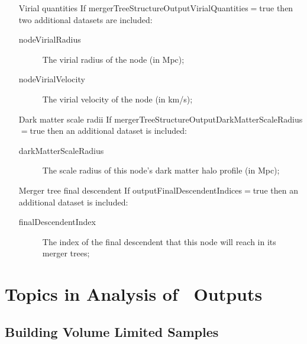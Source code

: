 \begin{itemize}
 \item [Virial quantities] If {\normalfont \ttfamily mergerTreeStructureOutputVirialQuantities}$=${\normalfont \ttfamily true} then two additional datasets are included:
 \begin{description}
  \item [{\normalfont \ttfamily nodeVirialRadius}] The virial radius of the node (in Mpc);
  \item [{\normalfont \ttfamily nodeVirialVelocity}] The virial velocity of the node (in km/s);
 \end{description}
 \item [Dark matter scale radii] If {\normalfont \ttfamily mergerTreeStructureOutputDarkMatterScaleRadius}$=${\normalfont \ttfamily true} then an additional dataset is included:
 \begin{description}
  \item [{\normalfont \ttfamily darkMatterScaleRadius}] The scale radius of this node's dark matter halo profile (in Mpc);
 \end{description}
 \item [Merger tree final descendent] If {\normalfont \ttfamily outputFinalDescendentIndices}$=${\normalfont \ttfamily true} then an additional dataset is included:
 \begin{description}
  \item [{\normalfont \ttfamily finalDescendentIndex}] The index of the final descendent that this node will reach in its merger trees;
 \end{description}
\end{itemize}

\section{Topics in Analysis of \glc\ Outputs}

\subsection{Building Volume Limited Samples}\label{sec:volumeLimitedSamples}

